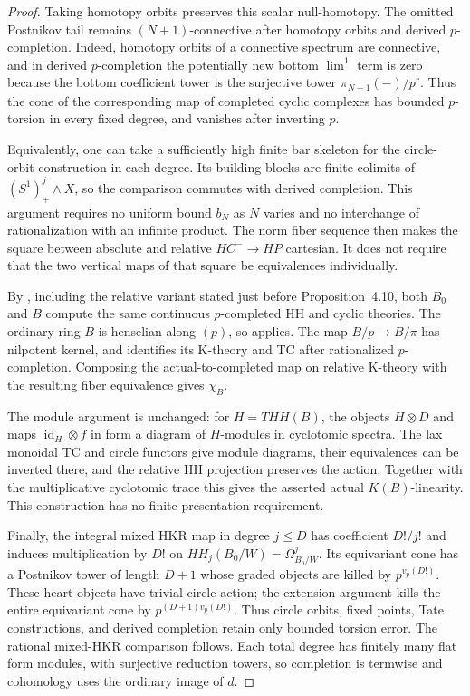 \begin{proof}
Taking homotopy orbits preserves this scalar null-homotopy.
The omitted Postnikov tail remains $(N+1)$-connective after
homotopy orbits and derived $p$-completion. Indeed, homotopy
orbits of a connective spectrum are connective, and in derived
$p$-completion the potentially new bottom $\lim^1$ term is zero
because the bottom coefficient tower is the surjective tower
$\pi_{N+1}(-)/p^r$. Thus the cone of the corresponding map of
completed cyclic complexes has bounded $p$-torsion in every fixed
degree, and vanishes after inverting $p$.

Equivalently, one can take a sufficiently high finite bar skeleton
for the circle-orbit construction in each degree. Its building blocks
are finite colimits of $(S^1)^j_+\wedge X$, so the comparison commutes
with derived completion. This argument requires no uniform bound
$b_N$ as $N$ varies and no interchange of rationalization with an
infinite product. The norm fiber sequence then makes the square
between absolute and relative $HC^-\to HP$ cartesian. It does not
require that the two vertical maps of that square be equivalences
individually.

By \cite[Proposition~4.2]{AMMN}, including the relative variant
stated just before Proposition~4.10, both $B_0$ and $B$ compute
the same continuous $p$-completed HH and cyclic theories.
The ordinary ring $B$ is henselian along $(p)$, so
\cite[Theorem~A]{AMMN} applies. The map $B/p\to B/\pi$ has
nilpotent kernel, and \cite[Corollary~3.8]{AMMN} identifies its
K-theory and TC after rationalized $p$-completion. Composing the
actual-to-completed map on relative K-theory with the resulting
fiber equivalence gives $\chi_B$.

The module argument is unchanged: for $H=THH(B)$, the objects
$H\otimes D$ and maps $\operatorname{id}_H\otimes f$ in
\cite[Proposition~2.8, Corollary~2.10, and Theorem~2.12]{AMMN}
form a diagram of $H$-modules in cyclotomic spectra.
The lax monoidal TC and circle functors give module diagrams,
their equivalences can be inverted there, and the relative HH
projection preserves the action. Together with the
multiplicative cyclotomic trace this gives the asserted actual
$K(B)$-linearity. This construction has no finite presentation
requirement.

Finally, the integral mixed HKR map in degree $j\le D$ has
coefficient $D!/j!$ and induces multiplication by $D!$ on
$HH_j(B_0/W)=\Omega^j_{B_0/W}$. Its equivariant cone has a
Postnikov tower of length $D+1$ whose graded objects are killed
by $p^{v_p(D!)}$. These heart objects have trivial circle action;
the extension argument kills the entire equivariant cone by
$p^{(D+1)v_p(D!)}$. Thus circle orbits, fixed points, Tate
constructions, and derived completion retain only bounded
torsion error. The rational mixed-HKR comparison follows.
Each total degree has finitely many flat form modules, with
surjective reduction towers, so completion is termwise and
cohomology uses the ordinary image of $d$.
\end{proof}

